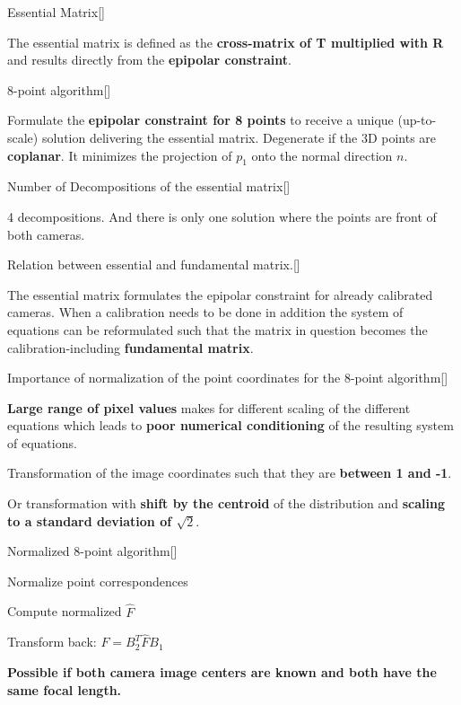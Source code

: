 \documentclass[10pt,a4paper]{scrartcl}
\begin{document}
\begin{multicols*}{2}
\begin{QandA}
{Essential Matrix}[\Definition]
\item The essential matrix is defined as the \textbf{cross-matrix of T multiplied with R} and results directly from the \textbf{epipolar constraint}.
\end{QandA}

\begin{QandA}
{8-point algorithm}[\Derivation]
\item Formulate the \textbf{epipolar constraint for 8 points} to receive a unique (up-to-scale) solution delivering the essential matrix. Degenerate if the 3D points are \textbf{coplanar}. It minimizes the projection of $p_1$ onto the normal direction $n$.
\end{QandA}

\begin{QandA}
{Number of Decompositions of the essential matrix}[\Application]
\item 4 decompositions. And there is only one solution where the points are front of both cameras.
\end{QandA}

\begin{QandA}
{Relation between essential and fundamental matrix.}[\Comparison]
\item The essential matrix formulates the epipolar constraint for already calibrated cameras. When a calibration needs to be done in addition the system of equations can be reformulated such that the matrix in question becomes the calibration-including \textbf{fundamental matrix}.
\end{QandA}

\begin{QandA}{Importance of normalization of the point coordinates for the 8-point algorithm}[\Derivation]
\item \textbf{Large range of pixel values} makes for different scaling of the different equations which leads to \textbf{poor numerical conditioning} of the resulting system of equations.
\item Transformation of the image coordinates such that they are \textbf{between 1 and -1}.
\item Or transformation with \textbf{shift by the centroid} of the distribution and \textbf{scaling to a standard deviation of $\sqrt{2}$}.
\end{QandA}

\begin{QandA}
{Normalized 8-point algorithm}[\Definition]
\item Normalize point correspondences
\item Compute normalized $\hat{F}$ 
\item Transform back: $F = B_2^T\hat{F} B_1$
\item \textbf{Possible if both camera image centers are known and both have the same focal length.}
\end{QandA}


\end{multicols*}
\end{document}
